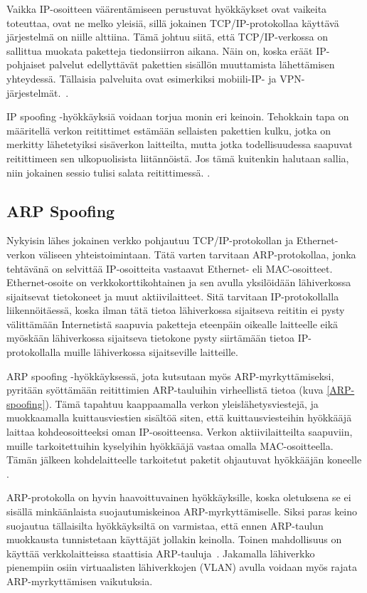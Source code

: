 Vaikka IP-osoitteen väärentämiseen perustuvat hyökkäykset ovat
vaikeita toteuttaa, ovat ne melko yleisiä, sillä jokainen
TCP/IP-protokollaa käyttävä järjestelmä on niille alttiina. Tämä
johtuu siitä, että TCP/IP-verkossa on sallittua muokata paketteja
tiedonsiirron aikana. Näin on, koska eräät IP-pohjaiset palvelut
edellyttävät pakettien sisällön muuttamista lähettämisen
yhteydessä. Tällaisia palveluita ovat esimerkiksi mobiili-IP- ja
VPN-järjestelmät.~\cite{DDOS}.

IP spoofing -hyökkäyksiä voidaan torjua monin eri keinoin. Tehokkain
tapa on määritellä verkon reitittimet estämään sellaisten pakettien
kulku, jotka on merkitty lähetetyiksi sisäverkon laitteilta, mutta
jotka todellisuudessa saapuvat reitittimeen sen ulkopuolisista
liitännöistä. Jos tämä kuitenkin halutaan sallia, niin jokainen sessio
tulisi salata reitittimessä. \cite{WEBS}.

\subsection{ARP Spoofing}

Nykyisin lähes jokainen verkko pohjautuu TCP/IP-protokollan ja
Ethernet-verkon väliseen yhteistoimintaan. Tätä varten tarvitaan
ARP-pro\-to\-kol\-laa, jonka tehtävänä on selvittää IP-osoitteita
vastaavat Ethernet- eli MAC-osoitteet. Ethernet-osoite on
verkkokorttikohtainen ja sen avulla yksilöidään lähiverkossa
sijaitsevat tietokoneet ja muut aktiivilaitteet.  Sitä tarvitaan
IP-protokollalla liikennöitäessä, koska ilman tätä tietoa
lähiverkossa sijaitseva reititin ei pysty
välittämään Internetistä saapuvia paketteja eteenpäin oikealle
laitteelle eikä myöskään lähiverkossa sijaitseva tietokone pysty
siirtämään tietoa IP-protokollalla muille lähiverkossa sijaitseville
laitteille.

ARP spoofing -hyökkäyksessä, jota kutsutaan myös ARP-myrkyttämiseksi,
pyritään syöttämään reitittimien ARP-tauluihin virheellistä
tietoa (kuva \ref{ARP-spoofing}). Tämä tapahtuu kaappaamalla verkon
yleislähetysviestejä, ja muokkaamalla kuittausviestien sisältöä siten,
että kuittausviesteihin hyökkääjä laittaa kohdeosoitteeksi oman
IP-osoitteensa. Verkon aktiivilaitteilta saapuviin, muille
tarkoitettuihin kyselyihin hyökkääjä vastaa omalla MAC-osoitteella.  Tämän
jälkeen kohdelaitteelle tarkoitetut paketit ohjautuvat hyökkääjän
koneelle \cite{WEBS}.

ARP-protokolla on hyvin haavoittuvainen hyökkäyksille, koska
oletuksena se ei sisällä minkäänlaista suojautumiskeinoa
ARP-myrkyttämiselle. Siksi paras keino suojautua tällaisilta
hyökkäyksiltä on varmistaa, että ennen ARP-taulun muokkausta
tunnistetaan käyttäjät jollakin keinolla. Toinen mahdollisuus on
käyttää verkkolaitteissa staattisia ARP-tauluja~\cite{WEBS}. Jakamalla
lähiverkko pienempiin osiin virtuaalisten lähiverkkojen (VLAN) avulla
voidaan myös rajata ARP-myrkyttämisen vaikutuksia.

